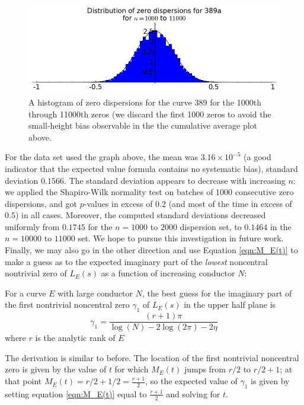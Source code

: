 \documentclass[10pt]{article}
\newcommand{\Les}{L_E(s)}
\begin{document}
\begin{figure}[!h]
    \centering
    \includegraphics[width=1.0\textwidth]{graphics/389a_zero_dispersions_histagram.png}
    \caption{A histogram of zero dispersions for the curve 389 for the 1000th through 11000th zeros (we discard the first 1000 zeros to avoid the small-height bias observable in the the cumulative average plot above. }
    \label{fig:389a_zero_dispersions_histagram}
\end{figure}

For the data set used the graph above, the mean was $3.16\times10^{-5}$ (a good indicator that the expected value formula contains no systematic bias), standard deviation $0.1566$. The standard deviation appears to decrease with increasing $n$: we applied the Shapiro-Wilk normality test on batches of 1000 consecutive zero dispersions, and got $p$-values in excess of $0.2$ (and most of the time in excess of 0.5) in all cases. Moreover, the computed standard deviations decreased uniformly from $0.1745$ for the $n=1000$ to $2000$ dispersion set, to $0.1464$ in the $n=10000$ to $11000$ set. We hope to pursue this investigation in future work. \\

Finally, we may also go in the other direction and use Equation \ref{eqn:M_E(t)} to make a guess as to the expected imaginary part of the {\it lowest} noncentral nontrivial zero of $\Les$ as a function of increasing conductor $N$:
\begin{proposition}
For a curve $E$ with large conductor $N$, the best guess for the imaginary part of the first nontrivial noncentral zero $\gamma_1$ of $\Les$ in the upper half plane is
\begin{equation}
\gamma_1 = \frac{(r+1)\pi}{\log(N) -2\log(2\pi) -2\eta}
\end{equation}
where $r$ is the analytic rank of $E$
\end{proposition}
The derivation is similar to before. The location of the first nontrivial noncentral zero is given by the value of $t$ for which $M_E(t)$ jumps from $r/2$ to $r/2+1$; at that point $M_E(t) = r/2 + 1/2 = \frac{r+1}{2}$, so the expected value of $\gamma_1$ is given by setting equation \ref{eqn:M_E(t)} equal to $\frac{r+1}{2}$ and solving for $t$. \\
\end{document}
